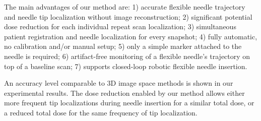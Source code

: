 \documentclass[letterpaper, 11 pt, conference]{ieeeconf}  %
\begin{document}
The main advantages of our method are:
1) accurate flexible needle trajectory and needle tip localization without image reconstruction;
2) significant potential dose reduction for each individual repeat scan localization;
3) simultaneous patient registration and needle localization for every snapshot; 
4) fully automatic, no calibration and/or manual setup;
5) only a simple marker attached to the needle is required; 
6) artifact-free monitoring of a flexible needle's trajectory on top of a baseline scan;
7) supports closed-loop robotic flexible needle insertion.

An accuracy level comparable to 3D image space methods is shown in our experimental results.
The dose reduction enabled by our method allows either more frequent tip localizations during needle insertion for a similar total dose, or a reduced total dose for the same frequency of tip localization.





\end{document}
